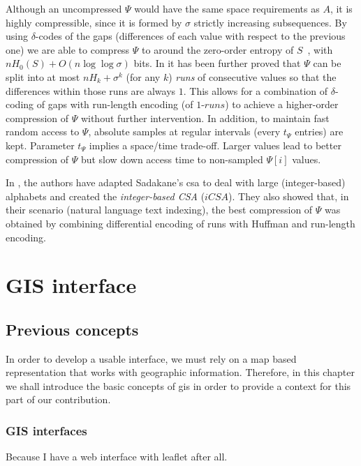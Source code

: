 \documentclass[a4paper,10pt,twoside]{book}
\begin{document}
    Although an uncompressed $\Psi$ would have the same space requirements
    as $A$, it is highly compressible, since it is formed by $\sigma$ strictly increasing subsequences. By using $\delta$-codes of the gaps (differences of each value with respect to the previous one) we are able to compress $\Psi$ to around the zero-order entropy of $S$~\cite{Sad03}, with $nH_0(S)+O(n\log\log\sigma)$ bits.
    In \cite{NM07} it has been further proved that $\Psi$ can be split into
    at most $nH_k+\sigma^k$ (for any $k$) {\em runs} of consecutive values so
    that the differences within those runs are always $1$. This allows for a combination of $\delta$-coding of gaps with run-length
    encoding (of $1$-$runs$) to achieve a higher-order compression of $\Psi$ without further intervention.
    In addition, to maintain fast random access to $\Psi$, absolute
    samples at regular intervals (every $t_{\Psi}$ entries) are kept. Parameter
    $t_{\Psi}$ implies a space/time trade-off. Larger values lead to better compression of $\Psi$ but slow down access time to non-sampled $\Psi[i]$ values.
    
    In \cite{FBNCPR12}, the authors have adapted Sadakane's \gls{csa} to deal with large (integer-based) alphabets
    and created the {\em integer-based CSA} ($iCSA$). They also showed that, in their scenario (natural language text indexing), the best
    compression of $\Psi$ was obtained by combining differential encoding of runs with Huffman and
    run-length encoding.

%
	

	
\part{GIS interface}
\chapter{Previous concepts}
    In order to develop a usable interface, we must rely on a map based representation that works with geographic information. Therefore, in this chapter we shall introduce the basic concepts of \gls{gis} in order to provide a context for this part of our contribution.

    \section{GIS interfaces}
	Because I have a web interface with leaflet after all.
\end{document}
